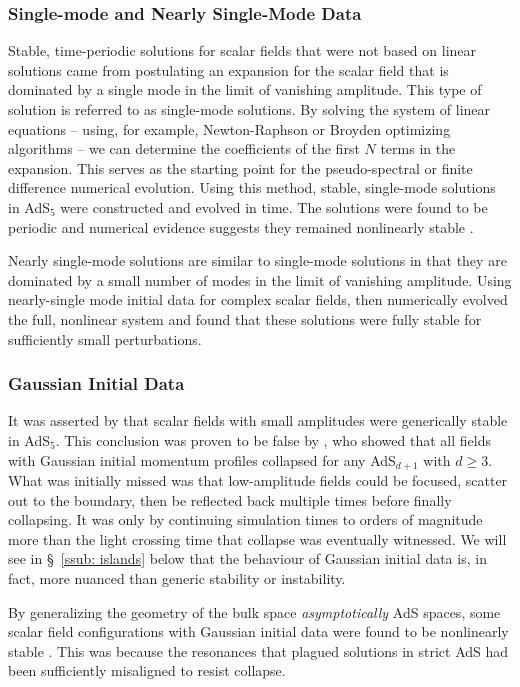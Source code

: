 \documentclass[../PhD.tex]{subfiles}
\begin{document}
\subsubsection{Single-mode and Nearly Single-Mode Data}

Stable, time-periodic solutions for scalar fields that were not based on linear solutions came from postulating an expansion for the scalar field that is dominated by a single mode in the limit of vanishing amplitude. This type of solution is referred to as single-mode solutions. By solving the system of linear equations -- using, for example, Newton-Raphson or Broyden optimizing algorithms -- we can determine the coefficients of the first $N$ terms in the expansion. This serves as the starting point for the pseudo-spectral or finite difference numerical evolution. Using this method, stable, single-mode solutions in AdS$_5$ were constructed and evolved in time. The solutions were found to be periodic and numerical evidence suggests they remained nonlinearly stable \cite{1303.3186}.

Nearly single-mode solutions are similar to single-mode solutions in that they are dominated by a small number of modes in the limit of vanishing amplitude. Using nearly-single mode initial data for complex scalar fields, \cite{1304.4166} then numerically evolved the full, nonlinear system and found that these solutions were fully stable for sufficiently small perturbations.

\subsubsection{Gaussian Initial Data}

It was asserted by \cite{1106.2339} that scalar fields with small amplitudes were generically stable in AdS$_5$. This conclusion was proven to be false by \cite{1108.4539}, who showed that all fields with Gaussian initial momentum profiles collapsed for any AdS$_{d+1}$ with $d \geq 3$. What was initially missed was that low-amplitude fields could be focused, scatter out to the boundary, then be reflected back multiple times before finally collapsing. It was only by continuing simulation times to orders of magnitude more than the light crossing time that collapse was eventually witnessed. We will see in \S~\ref{ssub: islands} below that the behaviour of Gaussian initial data is, in fact, more nuanced than generic stability or instability.

By generalizing the geometry of the bulk space \emph{asymptotically} AdS spaces, some scalar field configurations with Gaussian initial data were found to be nonlinearly stable \cite{1208.5772}. This was because the resonances that plagued solutions in strict AdS had been sufficiently misaligned to resist collapse. 
\end{document}

